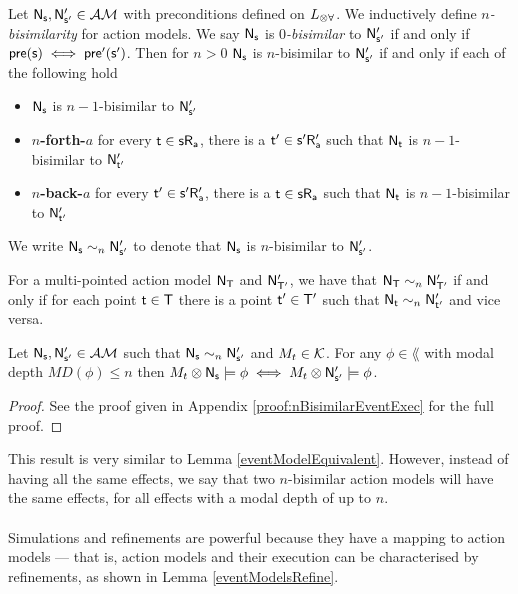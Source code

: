 \begin{defn} \label{nBisimEvent}
	Let $\mathrm{\mathsf{\mathrm{\mathsf{N}}_s, \mathrm{\mathsf{N}}'_{s'}}} \in \mathcal{AM}$ with preconditions defined on $L_{\otimes\forall}$.
	We inductively define {\em $n$-bisimilarity} for action models.
	We say $\mathrm{\mathsf{\mathrm{\mathsf{N}}_s}}$ is {\em $0$-bisimilar} to $\mathrm{\mathsf{\mathrm{\mathsf{N}}'_{s'}}}$ if and only if $\mathrm{\mathsf{pre(s) \iff
		pre'(s')}}$.
	Then for $n > 0$ $\mathrm{\mathsf{\mathrm{\mathsf{N}}_s}}$ is $n$-bisimilar to $\mathrm{\mathsf{\mathrm{\mathsf{N}}'_{s'}}}$ if and only if each of the following hold
	\begin{itemize}
		\item $\mathrm{\mathsf{\mathrm{\mathsf{N}}_s}}$ is $n-1$-bisimilar to $\mathrm{\mathsf{\mathrm{\mathsf{N}}'_{s'}}}$
		\item {\bf $n$-forth-$a$} for every $\mathrm{\mathsf{t \in s R_a}}$, there is a $\mathrm{\mathsf{t' \in s' R'_a}}$
		such that $\mathrm{\mathsf{\mathrm{\mathsf{N}}_t}}$ is
		$n-1$-bisimilar to $\mathrm{\mathsf{\mathrm{\mathsf{N}}'_{t'}}}$
		\item {\bf $n$-back-$a$} for every $\mathrm{\mathsf{t' \in s' R'_a}}$, there is a $\mathrm{\mathsf{t \in s R_a}}$ such
		that $\mathrm{\mathsf{\mathrm{\mathsf{N}}_t}}$ is
		$n-1$-bisimilar to $\mathrm{\mathsf{\mathrm{\mathsf{N}}'_{t'}}}$
	\end{itemize}
	We write $\mathrm{\mathsf{N}}_\mathrm{\mathsf{s}} \sim_n \mathrm{\mathsf{N}}'_{\mathrm{\mathsf{s}}'}$ to denote that $\mathrm{\mathsf{N}}_\mathrm{\mathsf{s}}$ is $n$-bisimilar to
	$\mathrm{\mathsf{N}}'_{\mathrm{\mathsf{s}}'}$.
\end{defn}

For a multi-pointed action model $\mathrm{\mathsf{\mathrm{\mathsf{N}}_T}}$ and $\mathrm{\mathsf{\mathrm{\mathsf{N}}'_{T'}}}$, we have that $\mathrm{\mathsf{N}}_\mathrm{\mathsf{T}} \sim_n
\mathrm{\mathsf{N}}'_{\mathrm{\mathsf{T}}'}$ if and only if for each point $\mathrm{\mathsf{t}} \in \mathrm{\mathsf{T}}$ there is a point $\mathrm{\mathsf{t}}' \in \mathrm{\mathsf{T}}'$
such that $\mathrm{\mathsf{N}}_\mathrm{\mathsf{t}} \sim_n \mathrm{\mathsf{N}}'_{\mathrm{\mathsf{t}}'}$ and vice versa.

\begin{lemma} \label{nBisimilarEventExec}
	Let $\mathrm{\mathsf{N}}_\mathrm{\mathsf{s}}, \mathrm{\mathsf{N}}'_{\mathrm{\mathsf{s}}'} \in \mathcal{AM}$ such that $\mathrm{\mathsf{N}}_\mathrm{\mathsf{s}} \sim_n \mathrm{\mathsf{N}}'_{\mathrm{\mathsf{s}}'}$ and
	$M_t \in \mathcal{K}$.
	For any $\phi \in \lang$ with modal depth $MD(\phi) \leq n$ then $M_t \otimes \mathrm{\mathsf{N}}_\mathrm{\mathsf{s}} \models \phi
	\iff M_t \otimes \mathrm{\mathsf{N}}'_{\mathrm{\mathsf{s}}'} \models \phi$.
\end{lemma}

\begin{proof}
	See the proof given in Appendix \ref{proof:nBisimilarEventExec} for the full proof.
\end{proof}

This result is very similar to Lemma \ref{eventModelEquivalent}.
However, instead of having all the same effects, we say that two $n$-bisimilar action models will
have the same effects, for all effects with a modal depth of up to $n$.\\
\\
Simulations and refinements are powerful because they have a mapping to action models --- that is,
action models and their execution can be characterised by refinements, as shown in Lemma
\ref{eventModelsRefine}.

